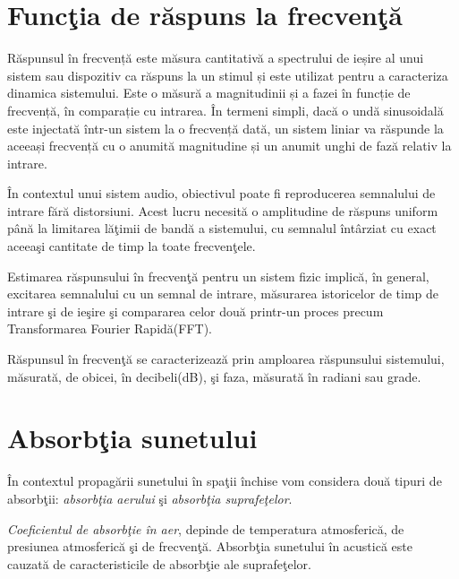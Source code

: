 	\section{Func\c{t}ia de r\u{a}spuns la frecven\c{t}\u{a}}
	
	Răspunsul în frecvență este măsura cantitativă a spectrului de ieșire al unui sistem sau dispozitiv ca răspuns la un stimul și este utilizat pentru a caracteriza dinamica sistemului. Este o măsură a magnitudinii și a fazei în funcție de frecvență, în comparație cu intrarea. În termeni simpli, dacă o undă sinusoidală este injectată într-un sistem la o frecvență dată, un sistem liniar va răspunde la aceeași frecvență cu o anumită magnitudine și un anumit unghi de fază relativ la intrare.
	\bigskip
	
	\^{I}n contextul unui sistem audio, obiectivul poate fi reproducerea semnalului de intrare f\u{a}r\u{a} distorsiuni. Acest lucru necesit\u{a} o amplitudine de r\u{a}spuns uniform p\^{a}n\u{a} la limitarea l\u{a}\c{t}imii de band\u{a} a sistemului, cu semnalul \^{i}nt\^{a}rziat cu exact aceea\c{s}i cantitate de timp la toate frecven\c{t}ele.
	\bigskip
	
	Estimarea r\u{a}spunsului \^{i}n frecven\c{t}\u{a} pentru un sistem fizic implic\u{a}, \^{i}n general, excitarea semnalului cu un semnal de intrare, m\u{a}surarea istoricelor de timp de intrare \c{s}i de ie\c{s}ire \c{s}i compararea celor dou\u{a} printr-un proces precum Transformarea Fourier Rapid\u{a}(FFT).
	\bigskip
	
	R\u{a}spunsul \^{i}n frecven\c{t}\u{a} se caracterizeaz\u{a} prin amploarea r\u{a}spunsului sistemului, m\u{a}surat\u{a}, de obicei, \^{i}n decibeli(dB), \c{s}i faza, m\u{a}surat\u{a} \^{i}n radiani sau grade.
	
	\section{Absorb\c{t}ia sunetului}
	
	\^{I}n contextul propag\u{a}rii sunetului \^{i}n spa\c{t}ii \^{i}nchise vom considera dou\u{a} tipuri de absorb\c{t}ii: \textit{absorb\c{t}ia aerului} \c{s}i \textit{absorb\c{t}ia suprafe\c{t}elor}.
	\bigskip
	
	\textit{Coeficientul de absorb\c{t}ie \^{i}n aer}, depinde de temperatura atmosferic\u{a}, de presiunea atmosferic\u{a} \c{s}i de frecven\c{t}\u{a}. Absorb\c{t}ia sunetului \^{i}n acustic\u{a} este cauzat\u{a} de caracteristicile de absorb\c{t}ie ale suprafe\c{t}elor.
	\bigskip
	
